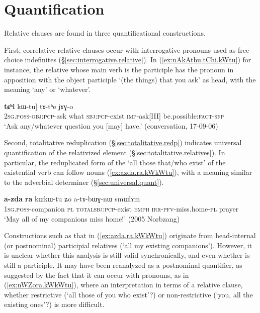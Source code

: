  
\section{Quantification} \label{sec:headless.relatives.quantification}
Relative clauses are found in three quantificational constructions. 

First, correlative relative clauses occur with interrogative pronouns used as free-choice indefinites (§\ref{sec:interrogative.relative}). In (\ref{ex:nAkAthu.tChi.kWtu}) for instance, the relative whose main verb is the participle  has the pronoun  in apposition with the object participle  `(the things) that you ask' as head, with the meaning `any' or `whatever'.

\begin{exe}
\ex \label{ex:nAkAthu.tChi.kWtu}
\gll [[\textbf{nɤ-kɤ-tʰu}] \textbf{tɕʰi} kɯ-tu] tɤ-tʰe jɤɣ-o \\
\textsc{2sg}.\textsc{poss}-\textsc{obj}:\textsc{pcp}-ask what \textsc{sbj}:\textsc{pcp}-exist \textsc{imp}-ask[III] be.possible:\textsc{fact}-\textsc{sfp} \\
\glt `Ask any/whatever question you [may] have.' (conversation, 17-09-06)
\end{exe}

 
Second, totalitative reduplication (§\ref{sec:totalitative.redp}) indicates universal quantification of the relativized element (§\ref{sec:totalitative.relatives}). In particular, the reduplicated form of the  `all those that/who exist' of the existential verb  can follow nouns (\ref{ex:azda.ra.kWkWtu}), with a meaning similar to the adverbial determiner  (§\ref{sec:universal.quant}). 

\begin{exe}
\ex \label{ex:azda.ra.kWkWtu}
\gll \textbf{a-zda} \textbf{ra} kɯ\redp{}kɯ-tu ʑo a-tɤ-bɯɣ-nɯ smɯlɤm \\
\textsc{1sg}.\textsc{poss}-companion \textsc{pl} \textsc{total}\redp{}\textsc{sbj}:\textsc{pcp}-exist \textsc{emph} \textsc{irr}-\textsc{pfv}-miss.home-\textsc{pl} prayer \\
\glt `May all of my companions miss home!' (2005 Norbzang)
\end{exe}

Constructions such as that in (\ref{ex:azda.ra.kWkWtu}) originate from head-internal (or postnominal) participial relatives (`all my existing companions'). However, it is unclear whether this analysis is still valid synchronically, and even whether  is still a participle. It may have been reanalyzed as a postnominal quantifier, as suggested by the fact that it can occur with pronouns, as in (\ref{ex:nWZora.kWkWtu}), where an interpretation in terms of a relative clause, whether restrictive (`all those of you who exist'?) or non-restrictive (`you, all the existing ones'?) is more difficult.
 
